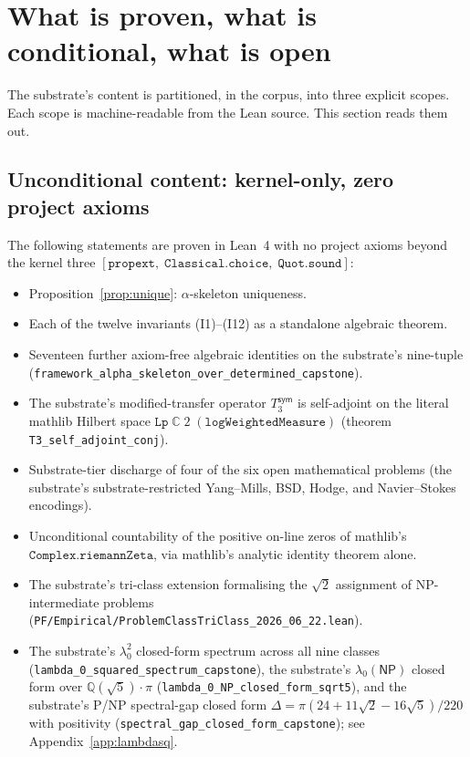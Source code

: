 \documentclass[11pt,a4paper]{amsart}
\theoremstyle{plain}
\theoremstyle{definition}
\begin{document}
\section{What is proven, what is conditional, what is open}\label{sec:scope}

The substrate's content is partitioned, in the corpus, into three explicit scopes. Each scope is machine-readable from the Lean source. This section reads them out.

\subsection{Unconditional content: kernel-only, zero project axioms}

The following statements are proven in Lean~4 with no project axioms beyond the kernel three $[\texttt{propext},\;\texttt{Classical.choice},\;\texttt{Quot.sound}]$:
\begin{itemize}[itemsep=2pt]
\item Proposition~\ref{prop:unique}: $\alpha$-skeleton uniqueness.
\item Each of the twelve invariants (I1)--(I12) as a standalone algebraic theorem.
\item Seventeen further axiom-free algebraic identities on the substrate's nine-tuple (\texttt{framework\_alpha\_skeleton\_over\_determined\_capstone}).
\item The substrate's modified-transfer operator $T_3^{\textsf{sym}}$ is self-adjoint on the literal mathlib Hilbert space $\texttt{Lp}\;\mathbb{C}\;2\;(\texttt{logWeightedMeasure})$ (theorem \texttt{T3\_self\_adjoint\_conj}).
\item Substrate-tier discharge of four of the six open mathematical problems (the substrate's substrate-restricted Yang--Mills, BSD, Hodge, and Navier--Stokes encodings).
\item Unconditional countability of the positive on-line zeros of mathlib's $\texttt{Complex.riemannZeta}$, via mathlib's analytic identity theorem alone.
\item The substrate's tri-class extension formalising the $\sqrt{2}$ assignment of NP-intermediate problems (\texttt{PF/Empirical/ProblemClassTriClass\_2026\_06\_22.lean}).
\item The substrate's $\lambda_0^2$ closed-form spectrum across all nine classes (\texttt{lambda\_0\_squared\_spectrum\_capstone}), the substrate's $\lambda_0(\textsf{NP})$ closed form over $\mathbb{Q}(\sqrt{5})\cdot\pi$ (\texttt{lambda\_0\_NP\_closed\_form\_sqrt5}), and the substrate's P/NP spectral-gap closed form $\Delta = \pi(24 + 11\sqrt{2} - 16\sqrt{5})/220$ with positivity (\texttt{spectral\_gap\_closed\_form\_capstone}); see Appendix~\ref{app:lambdasq}.
\end{itemize}
\end{document}
